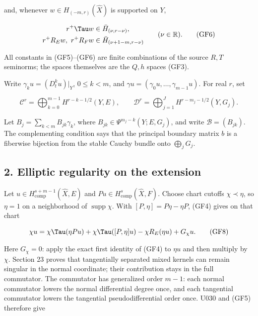 \documentclass[
  11pt,
]{article}
\makeatletter
\let\ReaderOriginalAnchorStart\hyper@anchorstart
\let\ReaderOriginalAnchorEnd\hyper@anchorend
\let\ReaderPendingAliases\@empty
\def\ReaderArmAliases#1{\gdef\ReaderPendingAliases{#1}}
\def\hyper@anchorstart#1{\ReaderIfNativeAnchorTF{#1}{\ReaderPendingAliases\global\let\ReaderPendingAliases\@empty}{}\ReaderOriginalAnchorStart{#1}}
\makeatother
\begin{document}
and, whenever \(w\in H_{(-m,r)}(\widehat X)\) is supported on \(Y\),

\[
 \begin{aligned}
 r^+\Tau w&\in\bar H_{(\nu,r-\nu)},\\
 r^+R_Ew,\ r^+R_Fw&\in\bar H_{(\nu+1-m,r-\nu)}
 \end{aligned}
 \qquad(\nu\in\mathbb R).
 \tag{GF6}
\]

All constants in (GF5)--(GF6) are finite combinations of the source
\(R,T\) seminorms; the spaces themselves are the \(Q,h\) spaces (GF3).

Write \(\gamma_k u=(D_t^ku)|_Y\), \(0\leq k<m\), and
\(\gamma u=(\gamma_0u,\ldots,\gamma_{m-1}u)\). For real \(r\), set

\[
 \mathcal C^r=\bigoplus_{k=0}^{m-1}H^{r-k-1/2}(Y,E),
 \qquad
 \mathcal D^r=\bigoplus_{j=1}^{J}H^{r-m_j-1/2}(Y,G_j).
 \tag{GF7}
\]

Let \(B_j=\sum_{k<m}B_{jk}\gamma_k\), where
\(B_{jk}\in\Psi^{m_j-k}(Y;E,G_j)\), and write \(\mathcal B=(B_{jk})\).
The complementing condition says that the principal boundary matrix
\(b\) is a fiberwise bijection from the stable Cauchy bundle onto
\(\bigoplus_jG_j\).

\ReaderArmAliases{\ReaderOriginalAnchorStart{AN03-GCF-002}\ReaderOriginalAnchorEnd\begingroup\expandafter\def\csname @currentHref\endcsname{AN03-GCF-002}\label{AN03-GCF-002}\endgroup\ReaderOriginalAnchorStart{2-elliptic-regularity-on-the-extension}\ReaderOriginalAnchorEnd\begingroup\expandafter\def\csname @currentHref\endcsname{2-elliptic-regularity-on-the-extension}\label{2-elliptic-regularity-on-the-extension}\endgroup\ReaderOriginalAnchorStart{elliptic-regularity-on-the-extension}\ReaderOriginalAnchorEnd}
\subsection{2. Elliptic regularity on the
extension}\label{elliptic-regularity-on-the-extension}

Let \(u\in H^{s+m-1}_{\mathrm{comp}}(\widehat X,E)\) and
\(Pu\in H^s_{\mathrm{comp}}(\widehat X,F)\). Choose chart cutoffs
\(\chi\prec\eta\), so \(\eta=1\) on a neighborhood of
\(\operatorname{supp}\chi\). With \([P,\eta]=P\eta-\eta P\), (GF4) gives
on that chart

\[
 \chi u
 =\chi\Tau(\eta Pu)+\chi\Tau([P,\eta]u)
   -\chi R_E(\eta u)+G_\chi u.
 \tag{GF8}
\]

Here \(G_\chi=0\): apply the exact first identity of (GF4) to \(\eta u\)
and then multiply by \(\chi\). Section 23 proves that tangentially
separated mixed kernels can remain singular in the normal coordinate;
their contribution stays in the full commutator. The commutator has
generalized order \(m-1\): each normal commutator lowers the normal
differential degree once, and each tangential commutator lowers the
tangential pseudodifferential order once. U030 and (GF5) therefore give
\end{document}
